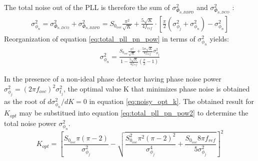 			The total noise out of the PLL is therefore the sum of $\sigma_{\Phi_{n,BBPD}}^2$ and $\sigma_{\Phi_{n,DCO}}^2$ : 
			\begin{align} \label{eq:total_pll_pn_pow}
				\sigma^2_{\phi_n}  = \sigma_{\Phi_{n,DCO}}^2 + \sigma_{\Phi_{n,BBPD}}^2 =
				S_{0_{osc}}\frac{\pi^2}{\sqrt{K}} +
				\frac{5\sqrt{K}}{4f_{ref}}\cdot\left[\frac{\pi}{2}(\sigma^2_{\phi_j} +
				\sigma^2_{\phi_n})-\sigma^2_{\phi_n}\right] 
			\end{align} 
			Reorganization of equation \ref{eq:total_pll_pn_pow} in terms of $\sigma^2_{\phi_n}$ yields:
			\begin{align} \label{eq:total_pll_pn_pow2} \sigma^2_{\phi_n}  =
				\frac{S_{0_{osc}}\frac{\pi^2}{\sqrt{K}} +
				\frac{5\pi\sqrt{K}}{8f_{ref}}\sigma^2_{\phi_j}}{1-\frac{5\sqrt{K}}{4f_{ref}}(\frac{\pi}{2}-1)}
			\end{align}			 



			In the presence of a non-ideal phase detector having phase noise power $\sigma^2_{\phi_j} = (2\pi f_{osc})^2\sigma^2_{t_j}$, the optimal value K that minimizes phase noise is obtained as the root of $d\sigma^2_{\phi_n}/dK = 0$ in equation \ref{eq:noisy_opt_k}. The obtained result for $K_{opt}$ may be substitued into equation \ref{eq:total_pll_pn_pow2} to determine the total noise power $\sigma^2_{\phi_n}$. 
			\begin{equation}\label{eq:noisy_opt_k}
				K_{opt} = \left[\frac{S_{0_{osc}}\pi(\pi-2)}{\sigma^2_{\phi_j}} -
				\sqrt{\frac{S_{0_{osc}}^2\pi^2(\pi-2)^2}{\sigma^4_{\phi_j}} +
				\frac{S_{0_{osc}}8\pi f_{ref}}{5\sigma^2_{\phi_j}}} \right]^2 
			\end{equation}

